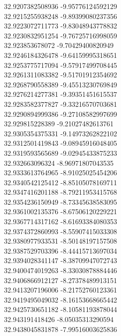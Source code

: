 {32.9207382508936	-9.95776124592129\\
32.9215255938248	-9.89399080237356\\
32.9223072711773	-9.83048943778832\\
32.9230832951254	-9.76725716998059\\
32.923853678072	-9.70429400820949\\
32.9246184326478	-9.64159995318651\\
32.9253775717094	-9.57917499708445\\
32.9261311083382	-9.51701912354692\\
32.9268790558389	-9.45513230769849\\
32.9276214277381	-9.39351451615537\\
32.9283582377827	-9.33216570703681\\
32.9290894999386	-9.27108582997699\\
32.929815228389	-9.21027482613761\\
32.9305354375331	-9.14973262822102\\
32.9312501419843	-9.08945916048405\\
32.9319593565689	-9.02945433875233\\
32.932663096324	-8.96971807043535\\
32.9333613764965	-8.91025025454206\\
32.9340542125412	-8.85105078169711\\
32.9347416201188	-8.79211953415768\\
32.9354236150949	-8.73345638583095\\
32.9361002135376	-8.67506120229221\\
32.9367714317162	-8.61693384080353\\
32.9374372860993	-8.55907415033308\\
32.9380977933531	-8.50148197157508\\
32.9387529703396	-8.44415713697034\\
32.9394028341147	-8.38709947072743\\
32.9400474019263	-8.33030878884446\\
32.9406866912127	-8.27378489913151\\
32.9413207196006	-8.21752760123361\\
32.9419495049032	-8.16153668665442\\
32.9425730651182	-8.10581193878044\\
32.943191418426	-8.05035313290594\\
32.9438045831878	-7.99516003625836\\
}
